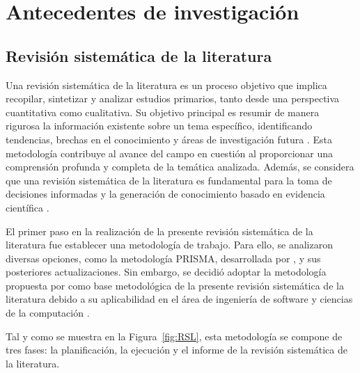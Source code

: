 \section{Antecedentes de investigación}
\label{sec:AntecedentesInvestigacion}

\subsection{Revisión sistemática de la literatura}
\label{suc:RevisionSistematicaLiteratura}

Una revisión sistemática de la literatura es un proceso objetivo que implica recopilar, sintetizar y analizar estudios primarios, tanto desde una perspectiva cuantitativa como cualitativa. Su objetivo principal es resumir de manera rigurosa la información existente sobre un tema específico, identificando tendencias, brechas en el conocimiento y áreas de investigación futura \cite{aromataris2014systematic}. Esta metodología contribuye al avance del campo en cuestión al proporcionar una comprensión profunda y completa de la temática analizada. Además, se considera que una revisión sistemática de la literatura es fundamental para la toma de decisiones informadas y la generación de conocimiento basado en evidencia científica \cite{manterola2013revisiones}.

El primer paso en la realización de la presente revisión sistemática de la literatura fue establecer una metodología de trabajo. Para ello, se analizaron diversas opciones, como la metodología PRISMA, desarrollada por \cite{moher2009preferred}, y sus posteriores actualizaciones. Sin embargo, se decidió adoptar la metodología propuesta por \cite{2007Kitchenham} como base metodológica de la presente revisión sistemática de la literatura debido a su aplicabilidad en el área de ingeniería de software y ciencias de la computación \cite{2019Bajaj, carrera2022context}.

Tal y como se muestra en la Figura~\ref{fig:RSL}, esta metodología se compone de tres fases: la planificación, la ejecución y el informe de la revisión sistemática de la literatura.

